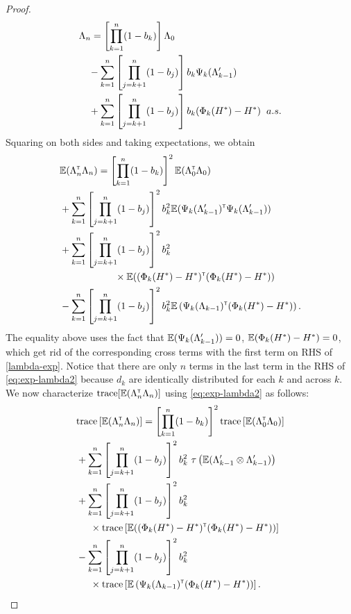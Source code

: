 \begin{proof}
 \begin{align}\label{lambda-exp}
&  \Lambda_n  = \left[ \prod_{k=1}^n (1-b_k) \right]\Lambda_0 \nonumber\\ 
&\quad- \sum_{k=1}^n \left[\prod_{j=k+1}^n (1-b_j)\right] b_k \Psi_k(\Lambda_{k-1}') \nonumber\\ 
&\quad+ \sum_{k=1}^n \left[\prod_{j=k+1}^n (1-b_j)\right] b_k (\Phi_k(H^*) - H^*) \hspace{0.2cm} a.s.
 \end{align}
Squaring on both sides and taking expectations, we obtain
 \begin{align}
 & \E (\Lambda_n \tr \Lambda_n) =  \left[ \prod_{k=1}^n (1-b_k) \right]^2 \E (\Lambda_0 \tr \Lambda_0)  \nonumber\\ &+ \sum_{k=1}^n \left[\prod_{j=k+1}^n (1-b_j)\right]^2 b_k^2   \E (\Psi_k(\Lambda_{k-1}') \tr \Psi_k(\Lambda_{k-1}'))  \nonumber\\ &+ \sum_{k=1}^n \left[\prod_{j=k+1}^n (1-b_j)\right]^2 b_k^2  \nonumber\\& \hspace{2cm} \times \E ((\Phi_k(H^*) - H^*) \tr  (\Phi_k(H^*) - H^*)) \nonumber\\
&-\sum_{k=1}^n \left[\prod_{j=k+1}^n (1-b_j)\right]^2 b_k^2 \E\left(\Psi_k(\Lambda_{k-1}) \tr (\Phi_k(H^*) - H^*)\right).\label{eq:exp-lambda2}
 \end{align}
The equality above uses the fact that $\mathbb{E}(\Psi_k(\Lambda_{k-1}'))=0$, $\mathbb{E}(\Phi_k(H^*) - H^*)=0$, which get rid of the corresponding cross terms with the first term on RHS of \eqref{lambda-exp}. Notice that there are only $n$ terms in the last term in the RHS of \eqref{eq:exp-lambda2} because $d_k$ are identically distributed for each $k$ and across $k$.  
We now characterize $\text{trace}[\mathbb{E}(\Lambda_n^\mathsf{\scriptscriptstyle T} \Lambda_n)]$ using \eqref{eq:exp-lambda2} as follows:
 \begin{align}\label{eq:trace}
 & \text{trace} \left[\E (\Lambda_n \tr \Lambda_n)\right] = \left[ \prod_{k=1}^n (1-b_k) \right]^2 \text{trace} \left[\E (\Lambda_0 \tr \Lambda_0)\right]  \nonumber\\ &+ \sum_{k=1}^n \left[\prod_{j=k+1}^n (1-b_j)\right]^2 b_k^2  \,\,\tau\left(\E (\Lambda_{k-1}' \otimes \Lambda_{k-1}')\right)  \nonumber\\ &+ \sum_{k=1}^n \left[\prod_{j=k+1}^n (1-b_j)\right]^2 b_k^2  \nonumber\\&  \hspace{0.5cm}\times \text{trace}\left[\E ((\Phi_k(H^*) - H^*) \tr  (\Phi_k(H^*) - H^*))\right]  \nonumber\\ &- \sum_{k=1}^n \left[\prod_{j=k+1}^n (1-b_j)\right]^2 b_k^2  \nonumber\\& \hspace{0.5cm} \times \text{trace} \left[\E\left(\Psi_k(\Lambda_{k-1}) \tr (\Phi_k(H^*) - H^*)\right)\right].
 \end{align}
 

\end{proof}
